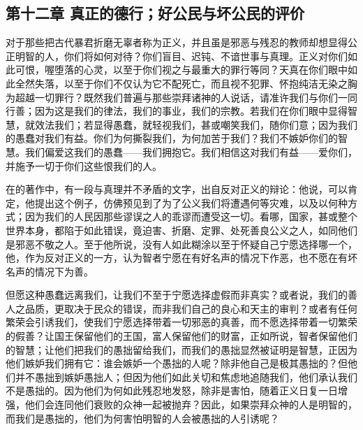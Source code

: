 
\subsection{第十二章 真正的德行；好公民与坏公民的评价}

对于那些把古代暴君折磨无辜者称为正义，并且虽是邪恶与残忍的教师却想显得公正明智的人，你们将如何对待？你们盲目、迟钝、不谙世事与真理。正义对你们如此可恨，喔堕落的心灵，以至于你们视之与最重大的罪行等同？天真在你们眼中如此全然失落，以至于你们不仅认为它不配死亡，而且视不犯罪、怀抱纯洁无染之胸为超越一切罪行？\newline{}既然我们普遍与那些崇拜诸神的人说话，请准许我们与你们一同行善；因为这是我们的律法，我们的事业，我们的宗教。若我们在你们眼中显得智慧，就效法我们；若显得愚蠢，就轻视我们，甚或嘲笑我们，随你们意；因为我们的愚蠢对我们有益。你们为何撕裂我们，为何加苦于我们？我们不嫉妒你们的智慧。我们偏爱这我们的愚蠢——我们拥抱它。我们相信这对我们有益——爱你们，并施予一切于你们这些恨我们的人。\par

在的著作中，有一段与真理并不矛盾的文字，出自反对正义的辩论：他说，可以肯定，他提出这个例子，仿佛预见到了为了公义我们将遭遇何等灾难，以及以何种方式；因为我们的人民因那些谬误之人的乖谬而遭受这一切。看哪，国家，甚或整个世界本身，都陷于如此错误，竟迫害、折磨、定罪、处死善良公义之人，如同他们是邪恶不敬之人。至于他所说，没有人如此糊涂以至于怀疑自己宁愿选择哪一个，他，作为反对正义的一方，认为智者宁愿在有好名声的情况下作恶，也不愿在有坏名声的情况下为善。\par

但愿这种愚蠢远离我们，让我们不至于宁愿选择虚假而非真实？或者说，我们的善人之品质，更取决于民众的错误，而非我们自己的良心和天主的审判？或者有任何繁荣会引诱我们，使我们宁愿选择带着一切邪恶的真善，而不愿选择带着一切繁荣的假善？让国王保留他们的王国，富人保留他们的财富，正如所说，智者保留他们的智慧；让他们把我们的愚拙留给我们，而我们的愚拙显然被证明是智慧，正因为他们嫉妒我们拥有它：谁会嫉妒一个愚拙的人呢？除非他自己是极其愚拙的？但他们并不愚拙到嫉妒愚拙人；但因为他们如此关切和焦虑地追随我们，他们承认我们不是愚拙的。因为他们为何如此残忍地发怒，除非是害怕，随着正义日复一日增强，他们会连同他们衰败的众神一起被抛弃？因此，如果崇拜众神的人是明智的，而我们是愚拙的，他们为何害怕明智的人会被愚拙的人引诱呢？\par

